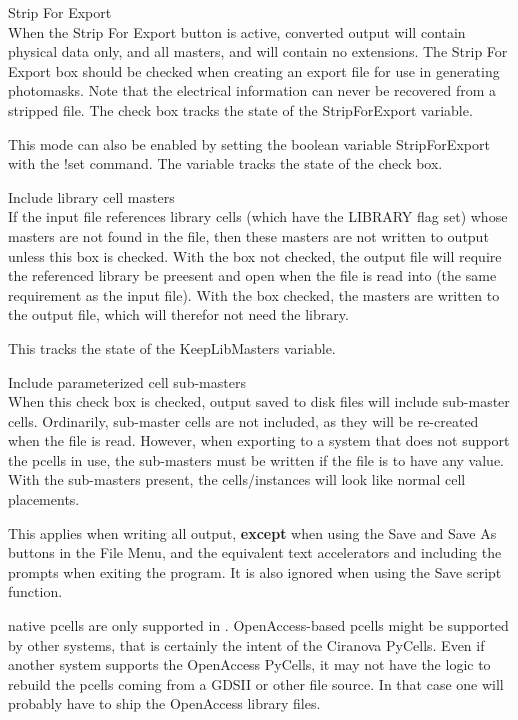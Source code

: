 \begin{description}
\item{\cb Strip For Export}\\
When the {\cb Strip For Export} button is active, converted output
will contain physical data only, and all masters, and will contain no
{\Xic} extensions.  The {\cb Strip For Export} box should be checked
when creating an export file for use in generating photomasks.  Note
that the electrical information can never be recovered from a stripped
file.  The check box tracks the state of the {\et StripForExport}
variable.

This mode can also be enabled by setting the boolean variable {\et
StripForExport} with the {\cb !set} command.  The variable tracks the
state of the check box.

\item{\cb Include library cell masters}\\
If the input file references library cells (which have the LIBRARY
flag set) whose masters are not found in the file, then these masters
are not written to output unless this box is checked.  With the box
not checked, the output file will require the referenced library be
preesent and open when the file is read into {\Xic} (the same
requirement as the input file).  With the box checked, the masters are
written to the output file, which will therefor not need the library.

This tracks the state of the {\et KeepLibMasters} variable.

\item{\cb Include parameterized cell sub-masters}\\
When this check box is checked, output saved to disk files will
include sub-master cells.  Ordinarily, sub-master cells are not
included, as they will be re-created when the file is read.  However,
when exporting to a system that does not support the pcells in use,
the sub-masters must be written if the file is to have any value. 
With the sub-masters present, the cells/instances will look like
normal cell placements.

This applies when writing all output, {\bf except} when using the {\cb
Save} and {\cb Save As} buttons in the {\cb File Menu}, and the
equivalent text accelerators and including the prompts when exiting
the program.  It is also ignored when using the {\vt Save} script
function.

{\Xic} native pcells are only supported in {\Xic}.  OpenAccess-based
pcells might be supported by other systems, that is certainly the
intent of the Ciranova PyCells.  Even if another system supports the
OpenAccess PyCells, it may not have the logic to rebuild the pcells
coming from a GDSII or other file source.  In that case one will
probably have to ship the OpenAccess library files.


\end{description}
